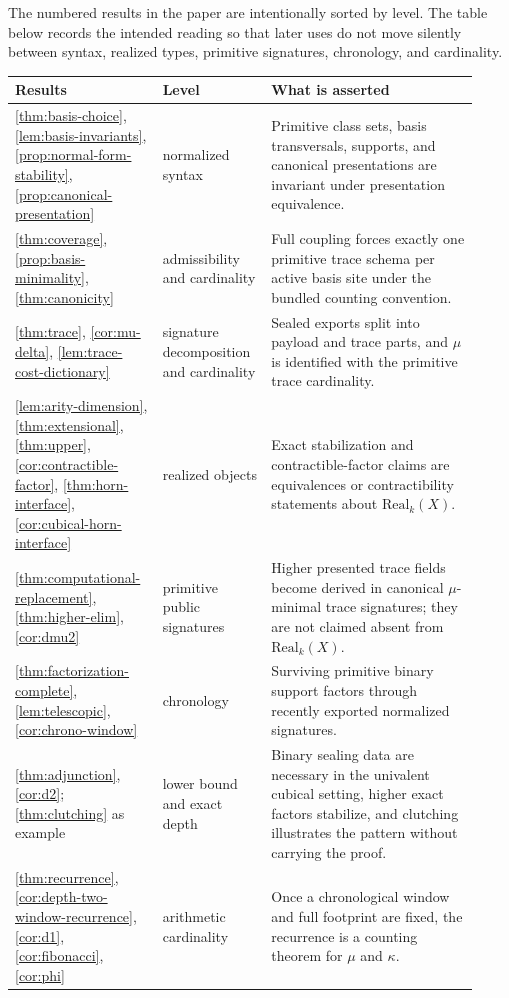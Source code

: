 \documentclass{lmcs}
\newcommand{\Real}{\mathrm{Real}}
\begin{document}
\begin{rem}
\label{rem:statement-level-audit}
The numbered results in the paper are intentionally sorted by level. The table
below records the intended reading so that later uses do not move silently
between syntax, realized types, primitive signatures, chronology, and
cardinality.
\begin{center}
\small
\begin{tabular}{@{}p{0.28\linewidth}p{0.22\linewidth}p{0.42\linewidth}@{}}
\toprule
Results & Level & What is asserted \\
\midrule
\autoref{thm:basis-choice}, \autoref{lem:basis-invariants},
\autoref{prop:normal-form-stability}, \autoref{prop:canonical-presentation}
& normalized syntax & Primitive class sets, basis transversals, supports, and
canonical presentations are invariant under presentation equivalence. \\
\autoref{thm:coverage}, \autoref{prop:basis-minimality},
\autoref{thm:canonicity}
& admissibility and cardinality & Full coupling forces exactly one primitive
trace schema per active basis site under the bundled counting convention. \\
\autoref{thm:trace}, \autoref{cor:mu-delta},
\autoref{lem:trace-cost-dictionary}
& signature decomposition and cardinality & Sealed exports split into payload
and trace parts, and $\mu$ is identified with the primitive trace cardinality. \\
\autoref{lem:arity-dimension}, \autoref{thm:extensional},
\autoref{thm:upper}, \autoref{cor:contractible-factor},
\autoref{thm:horn-interface}, \autoref{cor:cubical-horn-interface}
& realized objects & Exact stabilization and contractible-factor claims are
equivalences or contractibility statements about $\Real_k(X)$. \\
\autoref{thm:computational-replacement}, \autoref{thm:higher-elim},
\autoref{cor:dmu2}
& primitive public signatures & Higher presented trace fields become derived
in canonical $\mu$-minimal trace signatures; they are not claimed absent from
$\Real_k(X)$. \\
\autoref{thm:factorization-complete}, \autoref{lem:telescopic},
\autoref{cor:chrono-window}
& chronology & Surviving primitive binary support factors through recently
exported normalized signatures. \\
\autoref{thm:adjunction}, \autoref{cor:d2}; \autoref{thm:clutching} as example
& lower bound and exact depth & Binary sealing data are necessary in the
univalent cubical setting, higher exact factors stabilize, and clutching
illustrates the pattern without carrying the proof. \\
\autoref{thm:recurrence}, \autoref{cor:depth-two-window-recurrence},
\autoref{cor:d1}, \autoref{cor:fibonacci}, \autoref{cor:phi}
& arithmetic cardinality & Once a chronological window and full footprint are
fixed, the recurrence is a counting theorem for $\mu$ and $\kappa$. \\
\bottomrule
\end{tabular}
\end{center}
\end{rem}
\end{document}
